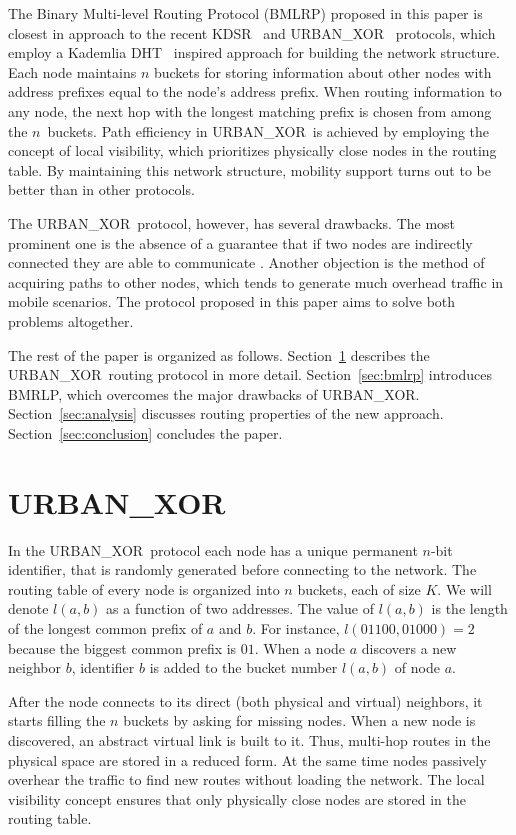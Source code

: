 \documentclass[conference]{IEEEtran}
\theoremstyle{definition}
\newcommand{\urbanxor}{URBAN\_XOR}
\begin{document}
The Binary Multi-level Routing Protocol (BMLRP) proposed in this paper is closest in approach to the recent KDSR~\cite{kdsr} and \urbanxor~\cite{Pasquini} protocols, which employ a Kademlia DHT~\cite{kademlia} inspired approach for building the network structure. Each node maintains $n$ buckets for storing information about other nodes with address prefixes equal to the node's address prefix. When routing information to any node, the next hop with the longest matching prefix is chosen from among the $n$~buckets. Path efficiency 
in \urbanxor~is achieved by employing the concept of local visibility, which prioritizes physically close nodes in the routing table. By maintaining this network structure, mobility support turns out to be better than in other protocols.

The \urbanxor\ protocol, however, has several drawbacks. The most prominent one is the absence of a guarantee that if two nodes are indirectly connected they are able to communicate \cite{Pasquini}. Another objection is the method of acquiring paths to other nodes, which tends to generate much overhead traffic in mobile scenarios.  The protocol proposed in this paper aims to solve both problems altogether.

The rest of the paper is organized as follows. Section~\ref{sec:urbanxor} describes the \urbanxor\ routing protocol in more detail. Section~\ref{sec:bmlrp} introduces BMRLP, which overcomes the major drawbacks of \urbanxor. 
Section~\ref{sec:analysis} discusses routing properties of the new approach. 
Section~\ref{sec:conclusion} concludes the paper.


\section{\urbanxor}
\label{sec:urbanxor}

In the \urbanxor\ protocol each node has a unique permanent $n$-bit identifier, that is randomly generated before connecting to the network. The routing table of every node is organized into $n$ buckets, each of size $K$. We will denote $l(a,b)$ as a function of two addresses. The value of $l(a,b)$ is the length of the longest common prefix of $a$ and $b$. For instance, $l(01100, 01000) = 2$ because the biggest common prefix is $01$. When a node $a$ discovers a new neighbor $b$, identifier $b$ is added to the bucket number $l(a,b)$ of node $a$.

After the node connects to its direct (both physical and virtual) neighbors, it starts filling the $n$ buckets by asking for missing nodes. When a new node is discovered, an abstract virtual link is built to it. Thus, multi-hop routes in the physical space are stored in a reduced form. At the same time nodes passively overhear the traffic to find new routes without loading the network. The local visibility concept ensures that only physically close nodes are stored in the routing table.
\end{document}
